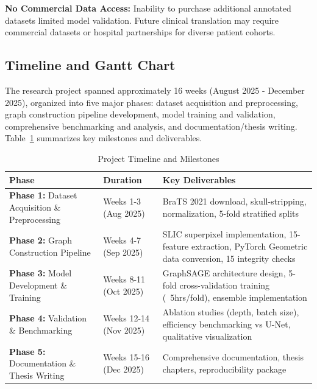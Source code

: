 \textbf{No Commercial Data Access:} Inability to purchase additional annotated datasets limited model validation. Future clinical translation may require commercial datasets or hospital partnerships for diverse patient cohorts.


\subsection{Timeline and Gantt Chart}

The research project spanned approximately 16 weeks (August 2025 - December 2025), organized into five major phases: dataset acquisition and preprocessing, graph construction pipeline development, model training and validation, comprehensive benchmarking and analysis, and documentation/thesis writing. Table~\ref{tab:timeline} summarizes key milestones and deliverables.

\begin{table}[htbp]
\caption{Project Timeline and Milestones}
\label{tab:timeline}
\begin{center}
\begin{tabularx}{\textwidth} { 
  | >{\raggedright\arraybackslash}X 
  | >{\centering\arraybackslash}X 
  | >{\raggedright\arraybackslash}X 
  | }
\hline
\textbf{Phase} & \textbf{Duration} & \textbf{Key Deliverables}\\
\hline
\textbf{Phase 1:} Dataset Acquisition \& Preprocessing & Weeks 1-3 (Aug 2025) & BraTS 2021 download, skull-stripping, normalization, 5-fold stratified splits\\
\hline
\textbf{Phase 2:} Graph Construction Pipeline & Weeks 4-7 (Sep 2025) & SLIC superpixel implementation, 15-feature extraction, PyTorch Geometric data conversion, 15 integrity checks\\
\hline
\textbf{Phase 3:} Model Development \& Training & Weeks 8-11 (Oct 2025) & GraphSAGE architecture design, 5-fold cross-validation training (~5hrs/fold), ensemble implementation\\
\hline
\textbf{Phase 4:} Validation \& Benchmarking & Weeks 12-14 (Nov 2025) & Ablation studies (depth, batch size), efficiency benchmarking vs U-Net, qualitative visualization\\
\hline
\textbf{Phase 5:} Documentation \& Thesis Writing & Weeks 15-16 (Dec 2025) & Comprehensive documentation, thesis chapters, reproducibility package\\
\hline
\end{tabularx}
\end{center}
\end{table}

